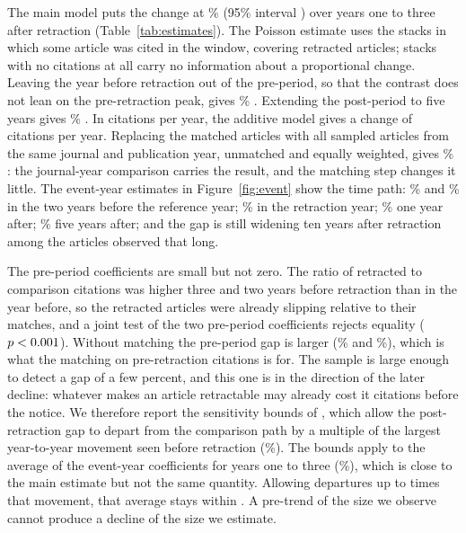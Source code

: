 \documentclass[11pt,letterpaper]{article}
\begin{document}
The main model puts the change at \MainPercent\% (95\% interval \MainInterval) over years one to three after retraction (Table~\ref{tab:estimates}). The Poisson estimate uses the \PoissonStacks{} stacks in which some article was cited in the window, covering \PoissonTreated{} retracted articles; stacks with no citations at all carry no information about a proportional change. Leaving the year before retraction out of the pre-period, so that the contrast does not lean on the pre-retraction peak, gives \EarlyPrePercent\% \EarlyPreInterval. Extending the post-period to five years gives \FivePercent\% \FiveInterval. In citations per year, the additive model gives a change of \AdditiveEstimate{} \AdditiveInterval{} citations per year. Replacing the matched articles with all \JournalYearComparison{} sampled articles from the same journal and publication year, unmatched and equally weighted, gives \JournalYearPercent\% \JournalYearInterval: the journal-year comparison carries the result, and the matching step changes it little. The event-year estimates in Figure~\ref{fig:event} show the time path: \EventMinusThree\% and \EventMinusTwo\% in the two years before the reference year; \EventZero\% in the retraction year; \EventOne\% one year after; \EventFive\% \EventFiveInterval{} five years after; and the gap is still widening ten years after retraction among the articles observed that long.

The pre-period coefficients are small but not zero. The ratio of retracted to comparison citations was higher three and two years before retraction than in the year before, so the retracted articles were already slipping relative to their matches, and a joint test of the two pre-period coefficients rejects equality ($p < 0.001$). Without matching the pre-period gap is larger (\JournalYearMinusThree\% and \JournalYearMinusTwo\%), which is what the matching on pre-retraction citations is for. The sample is large enough to detect a gap of a few percent, and this one is in the direction of the later decline: whatever makes an article retractable may already cost it citations before the notice. We therefore report the sensitivity bounds of \citet{rambachan2023}, which allow the post-retraction gap to depart from the comparison path by a multiple of the largest year-to-year movement seen before retraction (\HonestMaxPreChange\%). The bounds apply to the average of the event-year coefficients for years one to three (\HonestTarget\%), which is close to the main estimate but not the same quantity. Allowing departures up to \HonestMaxMbar{} times that movement, that average stays within \HonestIntervalAtMax. A pre-trend of the size we observe cannot produce a decline of the size we estimate.
\end{document}
